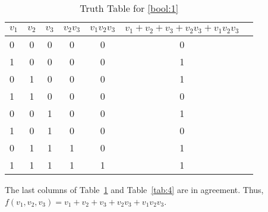 \begin{table}[!htp]\centering
\begin{tabular}{lcc|c|c|cc}\toprule
$v_1$ &$v_2$ &$v_3$ &$v_2v_3$ &$v_1v_2v_3$ &$v_1+v_2+v_3+v_2v_3+v_1v_2v_3$ \\\midrule
0 &0 &0 &0 &0 &0 \\
1 &0 &0 &0 &0 &1 \\
0 &1 &0 &0 &0 &1 \\
1 &1 &0 &0 &0 &0 \\
0 &0 &1 &0 &0 &1 \\
1 &0 &1 &0 &0 &0 \\
0 &1 &1 &1 &0 &1 \\
1 &1 &1 &1 &1 &1 \\
\bottomrule
\end{tabular}
\caption{Truth Table for \eqref{bool:1}}\label{tab:5}
\end{table}
The last columns of Table~\ref{tab:5} and Table~\ref{tab:4} are in agreement. Thus, $f(v_1, v_2, v_3) = v_1+v_2+v_3+v_2v_3+v_1v_2v_3$.

